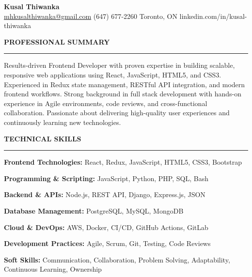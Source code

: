 \documentclass[10pt,letterpaper]{article}
\begin{document}
\begin{center}
{\LARGE\textbf{Kusal Thiwanka}}\\[3pt]
\href{mailto:mhkusalthiwanka@gmail.com}{mhkusalthiwanka@gmail.com}\hspace{2em}%
(647) 677{-}2260\hspace{2em}%
Toronto, ON\hspace{2em}
linkedin.com/in/kusal-thiwanka
\end{center}

\vspace{6pt}

\textbf{PROFESSIONAL SUMMARY}\\[-8pt]
\noindent\rule{\textwidth}{1pt}

\vspace{-2pt}

Results-driven Frontend Developer with proven expertise in building scalable, responsive web applications using React, JavaScript, HTML5, and CSS3. Experienced in Redux state management, RESTful API integration, and modern frontend workflows. Strong background in full stack development with hands-on experience in Agile environments, code reviews, and cross-functional collaboration. Passionate about delivering high-quality user experiences and continuously learning new technologies.

\vspace{8pt}

\textbf{TECHNICAL SKILLS}\\[-8pt]
\noindent\rule{\textwidth}{1pt}

\vspace{-2pt}

\textbf{Frontend Technologies:} React, Redux, JavaScript, HTML5, CSS3, Bootstrap

\textbf{Programming \& Scripting:} JavaScript, Python, PHP, SQL, Bash

\textbf{Backend \& APIs:} Node.js, REST API, Django, Express.js, JSON

\textbf{Database Management:} PostgreSQL, MySQL, MongoDB

\textbf{Cloud \& DevOps:} AWS, Docker, CI/CD, GitHub Actions, GitLab

\textbf{Development Practices:} Agile, Scrum, Git, Testing, Code Reviews

\textbf{Soft Skills:} Communication, Collaboration, Problem Solving, Adaptability, Continuous Learning, Ownership

\vspace{8pt}
\end{document}
